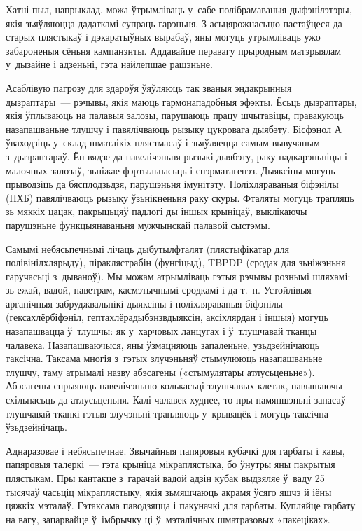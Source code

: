 Хатні пыл, напрыклад, можа ўтрымліваць у~сабе полібрамаваныя дыфэнілэтэры, якія зьяўляюцца дадаткамі супраць гарэньня. З асьцярожнасьцю пастаўцеся да старых плястыкаў і дэкаратыўных вырабаў, яны могуць утрымліваць ужо забароненыя сёньня кампанэнты. Аддавайце перавагу прыродным матэрыялам у~дызайне і адзеньні, гэта найлепшае рашэньне.

Асаблівую пагрозу для здароўя ўяўляюць так званыя эндакрынныя дызраптары~--- рэчывы, якія маюць гармонападобныя эфэкты. Ёсьць дызраптары, якія ўплываюць на палавыя залозы, парушаюць працу шчытавіцы, правакуюць назапашваньне тлушчу і павялічваюць рызыку цукровага дыябэту. Бісфэнол А ўваходзіць у~склад шматлікіх плястмасаў і зьяўляецца самым вывучаным з~дызраптараў. Ён вядзе да павелічэньня рызыкі дыябэту, раку падкарэньніцы і малочных залозаў, зьніжае фэртыльнасьць і спэрматагенэз. Дыяксіны могуць прыводзіць да бясплодзьдзя, парушэньня імунітэту. Поліхляраваныя біфэнілы (ПХБ) павялічваюць рызыку ўзьнікненьня раку скуры. Фталяты могуць трапляць зь мяккіх цацак, пакрыцьцяў падлогі ды іншых крыніцаў, выклікаючы парушэньне функцыянаваньня мужчынскай палавой сыстэмы.

Самымі небясьпечнымі лічаць дыбутылфталят (плястыфікатар для полівінілхлярыду), піраклястрабін (фунгіцыд), TBPDP (сродак для зьніжэньня гаручасьці з~дываноў). Мы можам атрымліваць гэтыя рэчывы рознымі шляхамі: зь ежай, вадой, паветрам, касмэтычнымі сродкамі і да т.~п. Устойлівыя арганічныя забруджвальнікі дыяксіны і поліхляраваныя біфэнілы (гексахлёрбіфэніл, гептахлёрадыбэнзвдыяксін, аксіхлярдан і іншыя) могуць назапашвацца ў~тлушчы: як у~харчовых ланцугах і ў~тлушчавай тканцы чалавека. Назапашваючыся, яны ўзмацняюць запаленьне, узьдзейнічаюць таксічна. Таксама многія з~гэтых злучэньняў стымулююць назапашваньне тлушчу, таму атрымалі назву абэсагены («стымулятары атлусьценьне»). Абэсагены спрыяюць павелічэньню колькасьці тлушчавых клетак, павышаючы схільнасьць да атлусьценьня. Калі чалавек худнее, то пры памяншэньні запасаў тлушчавай тканкі гэтыя злучэньні трапляюць у~крывацёк і могуць таксічна ўзьдзейнічаць.

Аднаразовае і небясьпечнае. Звычайныя папяровыя кубачкі для гарбаты і кавы, папяровыя талеркі~--- гэта крыніца мікраплястыка, бо ўнутры яны пакрытыя плястыкам. Пры кантакце з~гарачай вадой адзін кубак выдзяляе ў~ваду 25 тысячаў часьціц мікраплястыку, якія зьмяшчаюць акрамя ўсяго яшчэ й іёны цяжкіх мэталаў. Гэтаксама паводзяцца і пакуначкі для гарбаты. Купляйце гарбату на вагу, запарвайце ў~імбрычку ці ў~мэталічных шматразовых «пакеціках».

